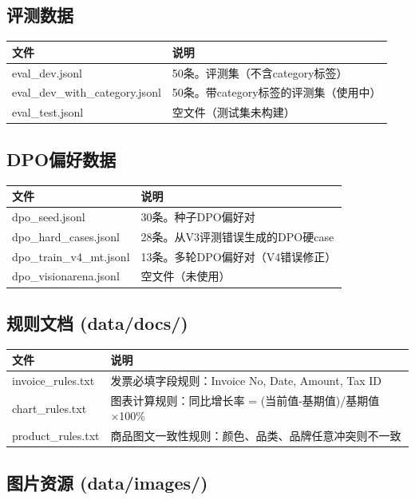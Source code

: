 \documentclass[fontset=none,11pt,a4paper]{ctexart}
\begin{document}
\subsection{评测数据}

\begin{longtable}{lp{9cm}}
\toprule
文件 & 说明 \\
\midrule
eval\_dev.jsonl & 50条。评测集（不含category标签） \\
eval\_dev\_with\_category.jsonl & 50条。带category标签的评测集（使用中） \\
eval\_test.jsonl & 空文件（测试集未构建） \\
\bottomrule
\end{longtable}

\subsection{DPO偏好数据}

\begin{longtable}{lp{9cm}}
\toprule
文件 & 说明 \\
\midrule
dpo\_seed.jsonl & 30条。种子DPO偏好对 \\
dpo\_hard\_cases.jsonl & 28条。从V3评测错误生成的DPO硬case \\
dpo\_train\_v4\_mt.jsonl & 13条。多轮DPO偏好对（V4错误修正） \\
dpo\_visionarena.jsonl & 空文件（未使用） \\
\bottomrule
\end{longtable}

\subsection{规则文档 (data/docs/)}

\begin{longtable}{lp{9cm}}
\toprule
文件 & 说明 \\
\midrule
invoice\_rules.txt & 发票必填字段规则：Invoice No, Date, Amount, Tax ID \\
chart\_rules.txt & 图表计算规则：同比增长率 = (当前值-基期值)/基期值×100\% \\
product\_rules.txt & 商品图文一致性规则：颜色、品类、品牌任意冲突则不一致 \\
\bottomrule
\end{longtable}

\subsection{图片资源 (data/images/)}
\end{document}
